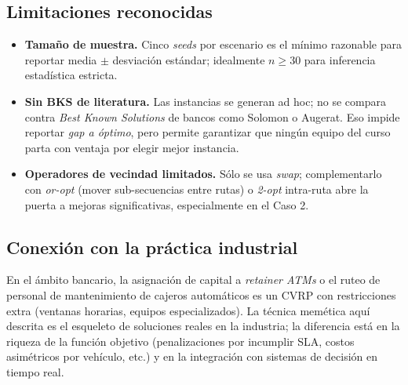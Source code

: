 \subsection{Limitaciones reconocidas}

\begin{itemize}
    \item \textbf{Tamaño de muestra.} Cinco \emph{seeds} por escenario es el mínimo razonable para reportar media $\pm$ desviación estándar; idealmente $n \geq 30$ para inferencia estadística estricta.
    \item \textbf{Sin BKS de literatura.} Las instancias se generan ad hoc; no se compara contra \emph{Best Known Solutions} de bancos como Solomon o Augerat. Eso impide reportar \emph{gap a óptimo}, pero permite garantizar que ningún equipo del curso parta con ventaja por elegir mejor instancia.
    \item \textbf{Operadores de vecindad limitados.} Sólo se usa \emph{swap}; complementarlo con \emph{or-opt} (mover sub-secuencias entre rutas) o \emph{2-opt} intra-ruta abre la puerta a mejoras significativas, especialmente en el Caso 2.
\end{itemize}

\subsection{Conexión con la práctica industrial}

En el ámbito bancario, la asignación de capital a \emph{retainer ATMs} o el ruteo de personal de mantenimiento de cajeros automáticos es un CVRP con restricciones extra (ventanas horarias, equipos especializados). La técnica memética aquí descrita es el esqueleto de soluciones reales en la industria; la diferencia está en la riqueza de la función objetivo (penalizaciones por incumplir SLA, costos asimétricos por vehículo, etc.) y en la integración con sistemas de decisión en tiempo real.

